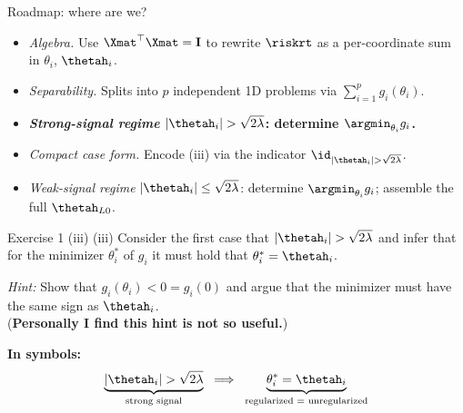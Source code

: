 \documentclass[aspectratio=169]{beamer}
\newcommand{\thetahi}{\thetah_i}
\newcommand{\thetai}{\theta_i}
\newcommand{\Imat}{\mathbf{I}}
\begin{document}
\begin{frame}{Roadmap: where are we?}
	\small
	\begin{itemize}\setlength{\itemsep}{6pt}\setlength{\parskip}{0pt}
		\item[\textcolor{black!55}{$\checkmark$\,\textbf{(i)}}] \textcolor{black!55}{\textit{Algebra.} Use $\Xmat^\top\Xmat = \Imat$ to rewrite $\riskrt$ as a per-coordinate sum in $\thetai$, $\thetahi$.}
		\item[\textcolor{black!55}{$\checkmark$\,\textbf{(ii)}}] \textcolor{black!55}{\textit{Separability.} Splits into $p$ independent 1D problems via $\sum_{i=1}^p g_i(\thetai)$.}
		\item[\structure{$\blacktriangleright$\,\textbf{(iii)}}] \textbf{\textit{Strong-signal regime} $|\thetahi| > \sqrt{2\lambda}$: determine $\argmin_{\thetai} g_i$.}
		\item[\textcolor{black!40}{(iv)}] \textcolor{black!40}{\textit{Compact case form.} Encode (iii) via the indicator $\id_{|\thetahi|>\sqrt{2\lambda}}$.}
		\item[\textcolor{black!40}{(v)}] \textcolor{black!40}{\textit{Weak-signal regime} $|\thetahi| \leq \sqrt{2\lambda}$: determine $\argmin_{\thetai} g_i$; assemble the full $\thetah_{L0}$.}
	\end{itemize}
\end{frame}

\begin{frame}{Exercise 1 (iii)}
	(iii) Consider the first case that $|\thetahi| > \sqrt{2 \lambda}$ and infer that for the minimizer $\thetai^*$ of $g_i$ it must hold that $\thetai^* = \thetahi$.

	\bigskip
	\emph{Hint:} Show that $g_i(\thetai) < 0 = g_i(0)$ and argue that the minimizer must have the same sign as $\thetahi$.\\
	{\small (\textbf{Personally I find this hint is not so useful.})}

	\bigskip
	\textbf{In symbols:}
	\[
		\underbrace{|\thetahi| > \sqrt{2\lambda}}_{\text{strong signal}} \;\;\Longrightarrow\;\; \underbrace{\theta^*_i = \thetahi}_{\text{regularized $=$ unregularized}}
	\]
\end{frame}
\end{document}
